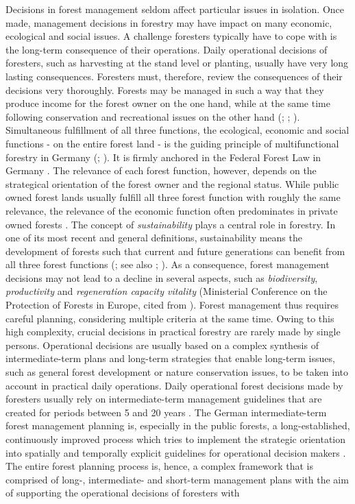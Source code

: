 Decisions in forest management seldom affect particular issues in isolation. Once made, management decisions in forestry may have impact on many economic, ecological and social issues. A challenge foresters typically have to cope with is the long-term consequence of their operations. Daily operational decisions of foresters, such as harvesting at the stand level or planting, usually have very long lasting consequences. Foresters must, therefore, review the consequences of their decisions very thoroughly. Forests may be managed in such a way that they produce income for the forest owner on the one hand, while at the same time following conservation and recreational issues on the other hand (\citealp[p. 11]{kangas_2015}; \citealp[p. 67]{mohring_1997}; \citealp[p. 100]{spellmann_2010}). Simultaneous fulfillment of all three functions, the ecological, economic and social functions - on the entire forest land - is the guiding principle of multifunctional forestry in Germany (\citealp[p. 75]{mohring_2010b}; \citealp[p. 100]{spellmann_2010}). It is firmly anchored in the Federal Forest Law in Germany \citep[p. 457]{moller_2007}. The relevance of each forest function, however, depends on the strategical orientation of the forest owner and the regional status. While public owned forest lands usually fulfill all three forest function with roughly the same relevance, the relevance of the economic function often predominates in private owned forests \citep[p. 76-77]{mohring_2010b}. The concept of \textit{sustainability} plays a central role in forestry. In one of its most recent and general definitions, sustainability means the development of forests such that current and future generations can benefit from all three forest functions (\citealp[p. 14]{un_2005}; see also \citealp[p. 14]{kangas_2015}; \citealp[p. 100-101]{spellmann_2010}). As a consequence, forest management decisions may not lead to a decline in several aspects, such as \textit{biodiversity}, \textit{productivity} and \textit{regeneration capacity vitality} (Ministerial Conference on the Protection of Forests in Europe, cited from \citealp[p. 15]{kangas_2015}). Forest management thus requires careful planning, considering multiple criteria at the same time. Owing to this high complexity, crucial decisions in practical forestry are rarely made by single persons. Operational decisions are usually based on a complex synthesis of intermediate-term plans and long-term strategies that enable long-term issues, such as general forest development or nature conservation issues, to be taken into account in practical daily operations. Daily operational forest decisions made by foresters usually rely on intermediate-term management guidelines that are created for periods between 5 and 20 years \citep[p. 12]{kangas_2015}. The German intermediate-term forest management planning is, especially in the public forests, a long-established, continuously improved process which tries to implement the strategic orientation into spatially and temporally explicit guidelines for operational decision makers \citep[p. 156-158]{bockmann_2004}. The entire forest planning process is, hence, a complex framework that is comprised of long-, intermediate- and short-term management plans with the aim of supporting the operational decisions of foresters with 